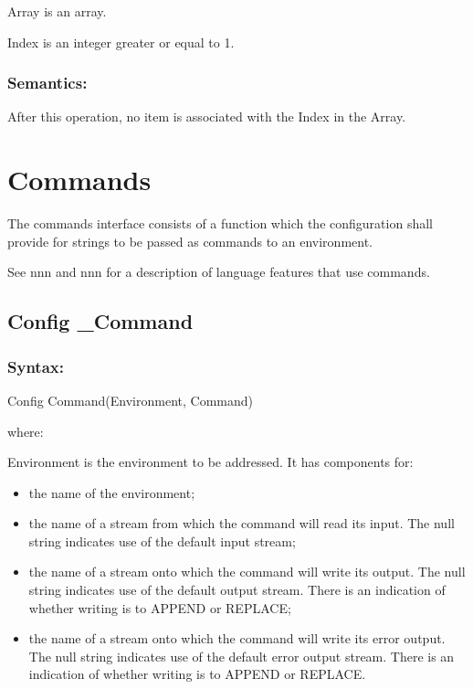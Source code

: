 Array is an array.

Index is an integer greater or equal to 1.

\subsubsection{Semantics:}\label{semantics-16}

After this operation, no item is associated with the Index in the Array.

\section{Commands}\label{commands}

The commands interface consists of a function which the configuration
shall provide for strings to be passed as commands to an environment.

See nnn and nnn for a description of language features that use
commands.

\subsection{Config \_Command}\label{config-_command}

\subsubsection{Syntax:}\label{syntax-16}

Config Command(Environment, Command)

where:

Environment is the environment to be addressed. It has components for:

\begin{itemize}
\item
  the name of the environment;
\item
  the name of a stream from which the command will read its input. The
  null string indicates use of the default input stream;
\item
  the name of a stream onto which the command will write its output. The
  null string indicates use of the default output stream. There is an
  indication of whether writing is to APPEND or REPLACE;
\item
  the name of a stream onto which the command will write its error
  output. The null string indicates use of the default error output
  stream. There is an indication of whether writing is to APPEND or
  REPLACE.
\end{itemize}


